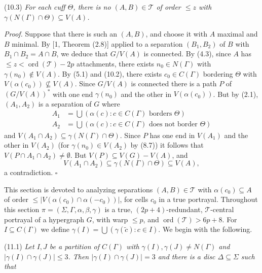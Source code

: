 \stmt
(10.3) \textit{For each cuff $\Theta$, there is no $(A, B) \in \mathcal{T}$ of order $\le z$ with $\gamma(N(\Gamma) \cap \Theta) \subseteq V(A)$.}

\textit{Proof.} Suppose that there is such an $(A, B)$, and choose it with $A$ maximal and $B$ minimal. By [1, Theorem (2.8)] applied to a separation $(B_1, B_2)$ of $B$ with $B_1 \cap B_2 = A \cap B$, we deduce that $G/V(A)$ is connected. By (4.3), since $A$ has $\le z < \operatorname{ord}(\mathcal{T}) - 2p$ attachments, there exists $n_0 \in N(\Gamma)$ with $\gamma(n_0) \notin V(A)$. By (5.1) and (10.2), there exists $c_0 \in C(\Gamma)$ bordering $\Theta$ with $V(\alpha(c_0)) \nsubseteq V(A)$. Since $G/V(A)$ is connected there is a path $P$ of $(G/V(A))^*$ with one end $\gamma(n_0)$ and the other in $V(\alpha(c_0))$. But by (2.1), $(A_1, A_2)$ is a separation of $G$ where
\begin{align*}
A_1 &= \bigcup (\alpha(c) \colon c \in C(\Gamma) \text{ borders } \Theta) \\
A_2 &= \bigcup (\alpha(c) \colon c \in C(\Gamma) \text{ does not border } \Theta)
\end{align*}
and $V(A_1 \cap A_2) \subseteq \gamma(N(\Gamma) \cap \Theta)$. Since $P$ has one end in $V(A_1)$ and the other in $V(A_2)$ (for $\gamma(n_0) \in V(A_2)$ by (8.7)) it follows that $V(P \cap A_1 \cap A_2) \ne \emptyset$. But $V(P) \subseteq V(G) - V(A)$, and
\begin{equation*}
V(A_1 \cap A_2) \subseteq \gamma(N(\Gamma) \cap \Theta) \subseteq V(A),
\end{equation*}
a contradiction. $\square$


This section is devoted to analyzing separations $(A, B) \in \mathcal{T}$ with $\alpha(c_0) \subseteq A$ of order $\le |V(\alpha(c_0) \cap \alpha(-c_0))|$, for cells $c_0$ in a true portrayal. Throughout this section $\pi = (\Sigma, \Gamma, \alpha, \beta, \gamma)$ is a true, $(2p + 4)$-redundant, $\mathcal{T}$-central portrayal of a hypergraph $G$, with warp $\le p$, and $\operatorname{ord}(\mathcal{T}) > 6p + 8$. For $I \subseteq C(\Gamma)$ we define $\gamma(I) = \bigcup (\gamma(\tilde{c}) \colon c \in I)$. We begin with the following.

\stmt
(11.1) \textit{Let $I, J$ be a partition of $C(\Gamma)$ with $\gamma(I), \gamma(J) \ne N(\Gamma)$ and $|\gamma(I) \cap \gamma(J)| \le 3$. Then $|\gamma(I) \cap \gamma(J)| = 3$ and there is a disc $\Delta \subseteq \Sigma$ such that}

